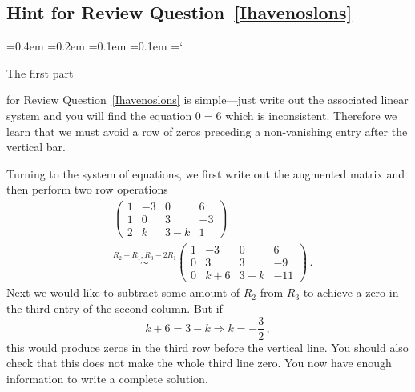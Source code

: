 
\subsection*{Hint for Review Question~\ref*{Ihavenoslons}}

{\ttfamily
{}\font=0.4em
\font=0.2em
\font=0.1em
\font=0.1em
\hyphenchar\font=`\-





\hypertarget{video_elementary_row_operations_hint}{The first part} for Review Question~\ref{Ihavenoslons} is simple---just 
write out the associated linear system and you will find the equation $0=6$ which is inconsistent. Therefore we learn 
that we must avoid a row of zeros preceding a non-vanishing entry after the vertical bar.

Turning to the system of equations, we first write out the augmented matrix and then perform two row operations
\begin{align*}
&\left(\begin{array}{ccc|c}1&-3&0&6\\1&0&3&-3\\2&k&3-k&1\end{array}\right)\\[2mm]
&\stackrel{R_2-R_1;R_3-2R_1}\sim
\left(\begin{array}{ccc|c}1&-3&0&6\\0&3&3&-9\\0&k+6&3-k&-11\end{array}\right)\, .
\end{align*}
Next we would like to subtract some amount of $R_2$ from $R_3$ to achieve a zero in the third entry of the second column. But if 
\[k+6=3-k\Rightarrow k=-\frac32\, ,\]
this would produce zeros in the third row before the vertical line.
You should also check that this does not make the whole third line zero. You now have enough information to write a complete solution.


}

